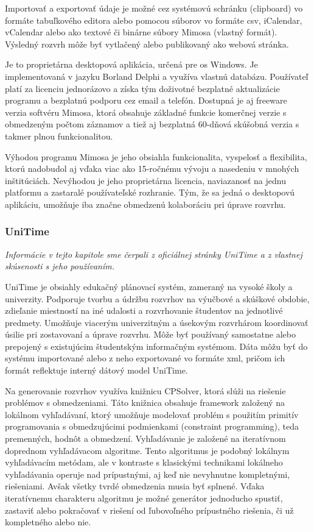 Importovať a exportovať údaje je možné cez systémovú schránku (clipboard) vo
formáte tabuľkového editora alebo pomocou súborov vo formáte \acrshort{csv},
iCalendar, vCalendar alebo ako textové či binárne súbory Mimosa (vlastný
formát). Výsledný rozvrh môže byť vytlačený alebo publikovaný ako webová
stránka.

Je to proprietárna desktopová aplikácia, určená pre \acrshort{os} Windows. Je
implementovaná v jazyku Borland Delphi a využíva vlastnú databázu. Používateľ
platí za licenciu jednorázovo a získa tým doživotné bezplatné aktualizácie
programu a bezplatnú podporu cez email a telefón. Dostupná je aj freeware verzia
softvéru Mimosa, ktorá obsahuje základné funkcie komerčnej verzie s obmedzeným
počtom záznamov a tiež aj bezplatná 60-dňová skúšobná verzia s takmer plnou
funkcionalitou.

Výhodou programu Mimosa je jeho obsiahla funkcionalita, vyspelosť a flexibilita,
ktorú nadobudol aj vďaka viac ako 15-ročnému vývoju a nasedeniu v mnohých
inštitúciách. Nevýhodou je jeho proprietárna licencia, naviazanosť na jednu
platformu a zastaralé používateľské rozhranie. Tým, že sa jedná o desktopovú
aplikáciu, umožňuje iba značne obmedzenú kolaboráciu pri úprave rozvrhu.

\subsubsection{UniTime}
\label{subsubsec:unitime}

\emph{Informácie v tejto kapitole sme čerpali z oficiálnej stránky UniTime
  \cite{unitime} a z vlastnej skúsenosti s jeho používaním.}

UniTime je obsiahly edukačný plánovací systém, zameraný na vysoké školy a
univerzity. Podporuje tvorbu a údržbu rozvrhov na výučbové a skúškové obdobie,
zdieľanie miestností na iné udalosti a rozvrhovanie študentov na jednotlivé
predmety. Umožňuje viacerým univerzitným a úsekovým rozvrhárom koordinovať
úsilie pri zostavovaní a úprave rozvrhu. Môže byť používaný samostatne alebo
prepojený s existujúcim študentským informačným systémom. Dáta môžu byť do
systému importované alebo z neho exportované vo formáte \acrshort{xml}, pričom
ich formát reflektuje interný dátový model UniTime.

Na generovanie rozvrhov využíva knižnicu CPSolver, ktorá slúži na riešenie
problémov s obmedzeniami. Táto knižnica obsahuje framework založený na lokálnom
vyhľadávaní, ktorý umožňuje modelovať problém s použitím primitív programovania
s obmedzujúcimi podmienkami (constraint programming), teda premenných, hodnôt a
obmedzení. Vyhľadávanie je založené na iteratívnom doprednom vyhľadávacom
algoritme. Tento algoritmus je podobný lokálnym vyhľadávacím metódam, ale v
kontraste s klasickými technikami lokálneho vyhľadávania operuje nad
prípustnými, aj keď nie nevyhnutne kompletnými, riešeniami. Avšak všetky tvrdé
obmedzenia musia byť splnené. Vďaka iteratívnemu charakteru algoritmu je možné
generátor jednoducho spustiť, zastaviť alebo pokračovať v riešení od ľubovoľného
prípustného riešenia, či už kompletného alebo nie.

